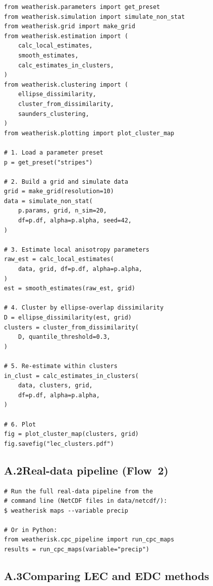 \documentclass[preprint,12pt,a4paper]{elsarticle}
\begin{document}
\begin{lstlisting}[caption={Complete synthetic validation
  workflow.}, label=lst:app-validate]
from weatherisk.parameters import get_preset
from weatherisk.simulation import simulate_non_stat
from weatherisk.grid import make_grid
from weatherisk.estimation import (
    calc_local_estimates,
    smooth_estimates,
    calc_estimates_in_clusters,
)
from weatherisk.clustering import (
    ellipse_dissimilarity,
    cluster_from_dissimilarity,
    saunders_clustering,
)
from weatherisk.plotting import plot_cluster_map

# 1. Load a parameter preset
p = get_preset("stripes")

# 2. Build a grid and simulate data
grid = make_grid(resolution=10)
data = simulate_non_stat(
    p.params, grid, n_sim=20,
    df=p.df, alpha=p.alpha, seed=42,
)

# 3. Estimate local anisotropy parameters
raw_est = calc_local_estimates(
    data, grid, df=p.df, alpha=p.alpha,
)
est = smooth_estimates(raw_est, grid)

# 4. Cluster by ellipse-overlap dissimilarity
D = ellipse_dissimilarity(est, grid)
clusters = cluster_from_dissimilarity(
    D, quantile_threshold=0.3,
)

# 5. Re-estimate within clusters
in_clust = calc_estimates_in_clusters(
    data, clusters, grid,
    df=p.df, alpha=p.alpha,
)

# 6. Plot
fig = plot_cluster_map(clusters, grid)
fig.savefig("lec_clusters.pdf")
\end{lstlisting}

\subsection{A.2\quad Real-data pipeline (Flow~2)}

\begin{lstlisting}[caption={CPC precipitation clustering via
  CLI.}, label=lst:app-cpc-cli]
# Run the full real-data pipeline from the
# command line (NetCDF files in data/netcdf/):
$ weatherisk maps --variable precip

# Or in Python:
from weatherisk.cpc_pipeline import run_cpc_maps
results = run_cpc_maps(variable="precip")
\end{lstlisting}

\subsection{A.3\quad Comparing LEC and EDC methods}
\end{document}
